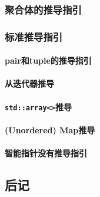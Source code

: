 \subsubsection{聚合体的推导指引}

\subsubsection{标准推导指引}

\paragraph{pair和tuple的推导指引}

\paragraph{从迭代器推导}

\paragraph{\texttt{std::array<>}推导}\label{ch9.2.6.3}

\paragraph{(Unordered) Map推导}

\paragraph{智能指针没有推导指引}

\subsection{后记}
